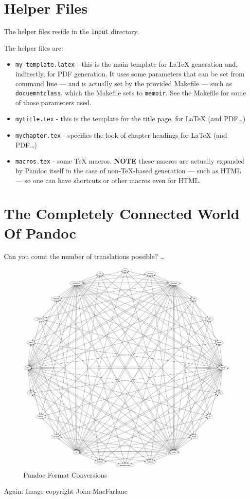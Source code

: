 \documentclass[oneside,]{memoir}
\makeatletter
\def\maxwidth{\ifdim\Gin@nat@width>\linewidth\linewidth
\else\Gin@nat@width\fi}
\let\Oldincludegraphics\includegraphics
\renewcommand{\includegraphics}[1]{\Oldincludegraphics[width=\maxwidth]{#1}}
\makeatother
\begin{document}
\section{Helper Files}

The helper files reside in the \texttt{input} directory.

The helper files are:

\begin{itemize}
\item
  \texttt{my-template.latex} - this is the main template for LaTeX
  generation and, indirectly, for PDF generation. It uses some
  parameters that can be set from command line --- and is actually set
  by the provided Makefile --- such as \texttt{docuemntclass}, which the
  Makefile sets to \texttt{memoir}. See the Makefile for some of those
  parameters used.
\item
  \texttt{mytitle.tex} - this is the template for the title page, for
  LaTeX (and PDF\ldots{})
\item
  \texttt{mychapter.tex} - specifies the look of chapter headings for
  LaTeX (and PDF\ldots{})
\item
  \texttt{macros.tex} - some TeX macros. \textbf{NOTE} these macros are
  actually expanded by Pandoc itself in the case of non-TeX-based
  generation --- such as HTML --- so one can have shortcuts or other
  macros even for HTML.
\end{itemize}
\section{The Completely Connected World Of Pandoc}

Can you count the number of translations possible? \ldots{}

\begin{figure}[htbp]
\centering
\includegraphics{./rez/diagram.png}
\caption{Pandoc Format Conversions}
\end{figure}

Again: Image copyright John MacFarlane
\end{document}
